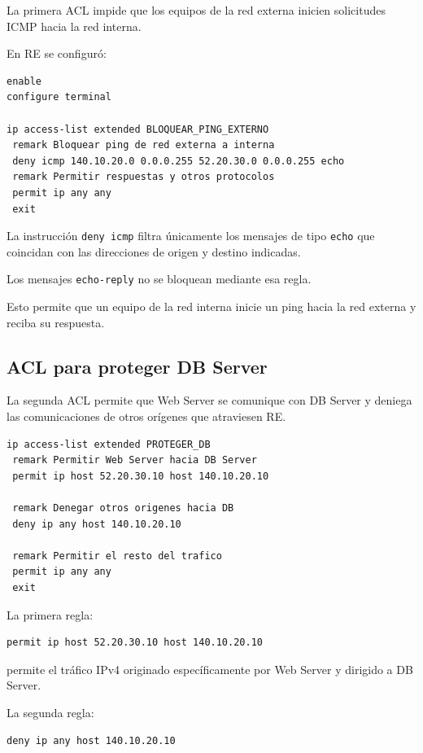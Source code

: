 \documentclass[12pt,a4paper]{article}
\begin{document}
La primera ACL impide que
los equipos de la red externa
inicien solicitudes ICMP
hacia la red interna.

En RE se configuró:

\begin{lstlisting}
enable
configure terminal

ip access-list extended BLOQUEAR_PING_EXTERNO
 remark Bloquear ping de red externa a interna
 deny icmp 140.10.20.0 0.0.0.255 52.20.30.0 0.0.0.255 echo
 remark Permitir respuestas y otros protocolos
 permit ip any any
 exit
\end{lstlisting}

La instrucción \texttt{deny icmp}
filtra únicamente los mensajes
de tipo \texttt{echo} que
coincidan con las direcciones
de origen y destino indicadas.

Los mensajes \texttt{echo-reply}
no se bloquean mediante esa regla.

Esto permite que un equipo
de la red interna inicie un ping
hacia la red externa y reciba
su respuesta.

\subsection{ACL para proteger DB Server}

La segunda ACL permite que
Web Server se comunique con
DB Server y deniega las
comunicaciones de otros
orígenes que atraviesen RE.

\begin{lstlisting}
ip access-list extended PROTEGER_DB
 remark Permitir Web Server hacia DB Server
 permit ip host 52.20.30.10 host 140.10.20.10

 remark Denegar otros origenes hacia DB
 deny ip any host 140.10.20.10

 remark Permitir el resto del trafico
 permit ip any any
 exit
\end{lstlisting}

La primera regla:

\begin{lstlisting}
permit ip host 52.20.30.10 host 140.10.20.10
\end{lstlisting}

permite el tráfico IPv4
originado específicamente
por Web Server y dirigido
a DB Server.

La segunda regla:

\begin{lstlisting}
deny ip any host 140.10.20.10
\end{lstlisting}
\end{document}
